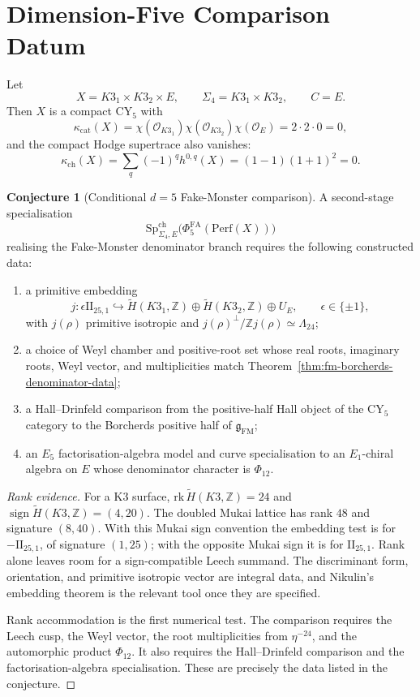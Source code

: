 \documentclass[11pt]{amsart}
\theoremstyle{definition}
\newtheorem{conjecture}[theorem]{Conjecture}
\theoremstyle{remark}
\providecommand{\Z}{\mathbb{Z}}
\providecommand{\cO}{\mathcal{O}}
\providecommand{\Leech}{\Lambda_{24}}
\providecommand{\IIlor}{\mathrm{II}_{25,1}}
\providecommand{\PhiFM}{\Phi_{12}}
\providecommand{\gFM}{\mathfrak{g}_{\mathrm{FM}}}
\providecommand{\PhiFA}{\Phi^{\mathrm{FA}}}
\providecommand{\SpCh}{\mathrm{Sp}^{\mathrm{ch}}}
\providecommand{\Perf}{\mathrm{Perf}}
\providecommand{\kch}{\kappa_{\mathrm{ch}}}
\providecommand{\kcat}{\kappa_{\mathrm{cat}}}
\providecommand{\rk}{\mathrm{rk}}
\begin{document}
\section{Dimension-Five Comparison Datum}

Let
\[
 X=K3_1\times K3_2\times E,\qquad
 \Sigma_4=K3_1\times K3_2,\qquad C=E .
\]
Then \(X\) is a compact CY\(_5\) with
\[
 \kcat(X)
 =
 \chi(\cO_{K3_1})\chi(\cO_{K3_2})\chi(\cO_E)
 =
 2\cdot2\cdot0
 =
 0,
\]
and the compact Hodge supertrace also vanishes:
\[
 \kch(X)=\sum_q(-1)^q h^{0,q}(X)
 =(1-1)(1+1)^2=0.
\]

\begin{conjecture}[Conditional \(d=5\) Fake-Monster comparison]
\label{conj:conditional-d5-fake-monster-comparison}
A second-stage specialisation
\[
 \SpCh_{\Sigma_4,E}\bigl(\PhiFA_5(\Perf(X))\bigr)
\]
realising the Fake-Monster denominator branch requires the following
constructed data:
\begin{enumerate}
\item a primitive embedding
\[
 j:\epsilon\IIlor\hookrightarrow
 \widetilde H(K3_1,\Z)\oplus \widetilde H(K3_2,\Z)\oplus U_E,
 \qquad \epsilon\in\{\pm1\},
\]
with \(j(\rho)\) primitive isotropic and
\(j(\rho)^\perp/\Z j(\rho)\simeq \Leech\);
\item a choice of Weyl chamber and positive-root set whose real roots,
imaginary roots, Weyl vector, and multiplicities match
Theorem~\ref{thm:fm-borcherds-denominator-data};
\item a Hall--Drinfeld comparison from the positive-half Hall object of
the CY\(_5\) category to the Borcherds positive half of \(\gFM\);
\item an \(E_5\) factorisation-algebra model and curve specialisation to
an \(E_1\)-chiral algebra on \(E\) whose denominator character is
\(\PhiFM\).
\end{enumerate}
\end{conjecture}

\begin{proof}[Rank evidence]
For a K3 surface,
\(\rk\,\widetilde H(K3,\Z)=24\) and
\(\operatorname{sign}\widetilde H(K3,\Z)=(4,20)\). The doubled Mukai
lattice has rank \(48\) and signature \((8,40)\). With this Mukai sign
convention the embedding test is for \(-\IIlor\), of signature
\((1,25)\); with the opposite Mukai sign it is for \(\IIlor\). Rank
alone leaves room for a sign-compatible Leech summand. The discriminant
form, orientation, and primitive isotropic vector are integral data, and
Nikulin's embedding theorem is the relevant tool once they are
specified.

Rank accommodation is the first numerical test. The comparison
requires the Leech cusp, the Weyl vector, the root multiplicities from
\(\eta^{-24}\), and the automorphic product \(\PhiFM\). It also requires
the Hall--Drinfeld comparison and the factorisation-algebra
specialisation. These are precisely the data listed in the conjecture.
\end{proof}
\end{document}

